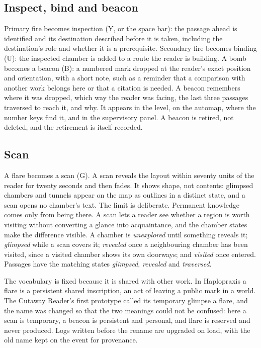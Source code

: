 \documentclass[11pt]{article}
\theoremstyle{remark}
\begin{document}
\subsection{Inspect, bind and beacon}

Primary fire becomes inspection (Y, or the space bar): the passage ahead is identified and its destination described before it is taken, including the destination's role and whether it is a prerequisite. Secondary fire becomes binding (U): the inspected chamber is added to a route the reader is building. A bomb becomes a beacon (B): a numbered mark dropped at the reader's exact position and orientation, with a short note, such as a reminder that a comparison with another work belongs here or that a citation is needed. A beacon remembers where it was dropped, which way the reader was facing, the last three passages traversed to reach it, and why. It appears in the level, on the automap, where the number keys find it, and in the supervisory panel. A beacon is retired, not deleted, and the retirement is itself recorded.

\subsection{Scan}

A flare becomes a scan (G). A scan reveals the layout within seventy units of the reader for twenty seconds and then fades. It shows shape, not contents: glimpsed chambers and tunnels appear on the map as outlines in a distinct state, and a scan opens no chamber's text. The limit is deliberate. Permanent knowledge comes only from being there. A scan lets a reader see whether a region is worth visiting without converting a glance into acquaintance, and the chamber states make the difference visible. A chamber is \emph{unexplored} until something reveals it; \emph{glimpsed} while a scan covers it; \emph{revealed} once a neighbouring chamber has been visited, since a visited chamber shows its own doorways; and \emph{visited} once entered. Passages have the matching states \emph{glimpsed}, \emph{revealed} and \emph{traversed}.

The vocabulary is fixed because it is shared with other work. In Haplopraxis a flare is a persistent shared inscription, an act of leaving a public mark in a world. The Cutaway Reader's first prototype called its temporary glimpse a flare, and the name was changed so that the two meanings could not be confused: here a scan is temporary, a beacon is persistent and personal, and flare is reserved and never produced. Logs written before the rename are upgraded on load, with the old name kept on the event for provenance.
\end{document}
